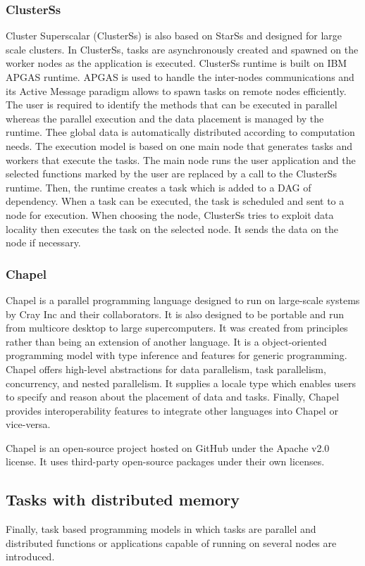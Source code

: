 \subsubsection{ClusterSs}
Cluster Superscalar (ClusterSs) \cite{TFGBA2011} is also based on StarSs \cite{PerRL2007} and designed for large scale clusters.
In ClusterSs, tasks are asynchronously created and spawned on the worker nodes as the application is executed.
ClusterSs runtime is built on IBM APGAS runtime.
APGAS is used to handle the inter-nodes communications and its Active Message paradigm allows to spawn tasks on remote nodes efficiently.
The user is required to identify the methods that can be executed in parallel whereas the parallel execution and the data placement is managed by the runtime.
Thee global data is automatically distributed according to computation needs.
The execution model is based on one main node that generates tasks and workers that execute the tasks.
The main node runs the user application and the selected functions marked by the user are replaced by a call to the ClusterSs runtime.
Then, the runtime creates a task which is added to a DAG of dependency.
When a task can be executed, the task is scheduled and sent to a node for execution.
When choosing the node, ClusterSs tries to exploit data locality then executes the task on the selected node.
It sends the data on the node if necessary.

\subsubsection{Chapel}
Chapel \cite{CalCZ2004} is a parallel programming language designed to run on large-scale systems by Cray Inc and their collaborators.
It is also designed to be portable and run from multicore desktop to large supercomputers.
It was created from principles rather than being an extension of another language.
It is a object-oriented programming model with type inference and features for generic programming.
Chapel offers high-level abstractions for data parallelism, task parallelism, concurrency, and nested parallelism.
It supplies a locale type which enables users to specify and reason about the placement of data and tasks.
Finally, Chapel provides interoperability features to integrate other languages into Chapel or vice-versa.

Chapel is an open-source project hosted on GitHub under the Apache v2.0 license.
It uses third-party open-source packages under their own licenses.

\subsection{Tasks with distributed memory}
Finally, task based programming models in which tasks are parallel and distributed functions or applications capable of running on several nodes are introduced.

